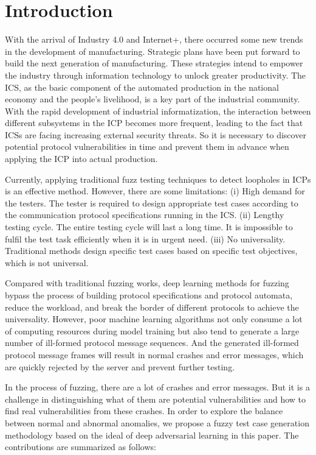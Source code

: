 \section{Introduction}

With the arrival of Industry 4.0 \cite{lasi2014industry} and Internet+, there occurred some new trends in the development of manufacturing. Strategic plans have been put forward to build the next generation of manufacturing. These strategies intend to empower the industry through information technology to unlock greater productivity. The ICS, as the basic component of the automated production in the national economy and the people's livelihood, is a key part of the industrial community. With the rapid development of industrial informatization, the interaction between different subsystems in the ICP becomes more frequent, leading to the fact that ICSs are facing increasing external security threats. So it is necessary to discover potential protocol vulnerabilities in time and prevent them in advance when applying the ICP into actual production.

Currently, applying traditional fuzz testing techniques to detect loopholes in ICPs is an effective method. However, there are some limitations: (i) High demand for the testers. The tester is required to design appropriate test cases according to the communication protocol specifications running in the ICS. (ii) Lengthy testing cycle. The entire testing cycle will last a long time. It is impossible to fulfil the test task efficiently when it is in urgent need. (iii) No universality. Traditional methods design specific test cases based on specific test objectives, which is not universal.

Compared with traditional fuzzing works, deep learning methods for fuzzing bypass the process of building protocol specifications and protocol automata, reduce the workload, and break the border of different protocols to achieve the universality. However, poor machine learning algorithms not only consume a lot of computing resources during model training but also tend to generate a large number of ill-formed protocol message sequences. And the generated ill-formed protocol message frames will result in normal crashes and error messages, which are quickly rejected by the server and prevent further testing.

In the process of fuzzing, there are a lot of crashes and error messages. But it is a challenge in distinguishing what of them are potential vulnerabilities and how to find real vulnerabilities from these crashes. In order to explore the balance between normal and abnormal anomalies, we propose a fuzzy test case generation methodology based on the ideal of deep adversarial learning in this paper. The contributions are summarized as follows:

